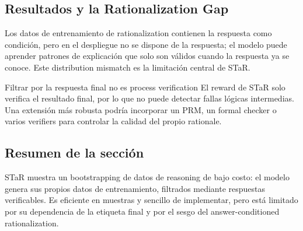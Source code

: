 \subsection{Resultados y la Rationalization Gap}



Los datos de entrenamiento de rationalization contienen la respuesta como condición, pero en el despliegue no se dispone de la respuesta; el modelo puede aprender patrones de explicación que solo son válidos cuando la respuesta ya se conoce. Este distribution mismatch es la limitación central de STaR.

\begin{warningbox}{Filtrar por la respuesta final no es process verification}
El reward de STaR solo verifica el resultado final, por lo que no puede detectar fallas lógicas intermedias. Una extensión más robusta podría incorporar un PRM, un formal checker o varios verifiers para controlar la calidad del propio rationale.
\end{warningbox}

\subsection{Resumen de la sección}

STaR muestra un bootstrapping de datos de reasoning de bajo costo: el modelo genera sus propios datos de entrenamiento, filtrados mediante respuestas verificables. Es eficiente en muestras y sencillo de implementar, pero está limitado por su dependencia de la etiqueta final y por el sesgo del answer-conditioned rationalization.
